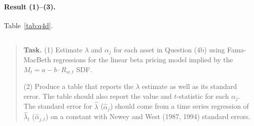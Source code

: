 \documentclass[11pt]{article}
\newcommand{\task}[1]{\begin{quote}\small\textbf{Task.} #1\end{quote}}
\begin{document}
\paragraph{Result (1)--(3).}
Table~\ref{tab:q4d}.

\begin{table}[p]
  \centering
  \small
  \renewcommand{\arraystretch}{0.9}
  \captionsetup{font=small}
  
  \caption{Time-series estimates of $\lambda$ and $\alpha_j$ with the factor $F_t = xR_{w,t}$, for both sample
    versions (rows and blocks labelled by version). Samples: (1) Common: December 1940 to December 2021 ($T = 973$ months); (2) Max: June 1928 to December 2021 ($T = 1123$ months). Data: monthly observations of 12-month returns, as in
    Table~\ref{tab:q4b}. Units: decimals. Panel A: $\hat{\lambda}$ with its standard error in the next
    column; Panel B: $\hat{\alpha}_j$ with $t$-statistics, book-to-market and momentum deciles side by side and
    the market below; Panel C: GRS test and Newey--West lags. Standard error of $\hat{\lambda}$ and
    $t$-statistics of $\hat{\alpha}_j$: Newey--West (1987, 1994), Bartlett kernel, Newey--West (1994)
    automatic lag rounded down, selected for each regression (lags in Panel C). GRS: $F(20, 1102)$ test that the 20 decile-portfolio $\alpha_j$ are jointly zero.
    ``--'': undefined (for the factor itself $\hat{\alpha} = 0$ by construction).}
  \label{tab:q4d}
\end{table}


\FloatBarrier
\subsection{}\label{q4e}
\task{(1) Estimate $\lambda$ and $\alpha_j$ for each asset in Question (4b) using Fama-MacBeth regressions for the linear beta pricing model implied by the $M_t = a - b \cdot R_{w,t}$ SDF.\par (2) Produce a table that reports the $\lambda$ estimate as well as its standard error. The table should also report the value and $t$-statistic for each $\alpha_j$. The standard error for $\hat{\lambda}$ ($\hat{\alpha}_j$) should come from a time series regression of $\hat{\lambda}_t$ ($\hat{\alpha}_{j,t}$) on a constant with Newey and West (1987, 1994) standard errors.}
\end{document}
